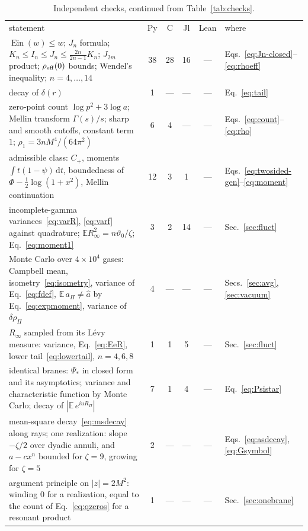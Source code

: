 \documentclass[aps,prd,10pt,twocolumn,superscriptaddress,nofootinbib,floatfix,longbibliography]{revtex4-2}
\newcommand{\bE}{\mathbb{E}}
\newcommand{\dd}{\mathrm{d}}
\newcommand{\Ein}{\operatorname{Ein}}
\begin{document}
\begin{table}[tp]
\caption{Independent checks, continued from Table~\ref{tab:checks}.}
\label{tab:checks2}
\begin{ruledtabular}
\setlength{\tabcolsep}{4pt}
\begin{tabular}{p{10.6cm}ccccl}
statement & Py & C & Jl & Lean & where\\
\colrule
$\Ein(w)\le w$; $J_n$ formula; $K_n\le I_n\le J_n\le\frac{2n}{2n-1}K_n$; $J_{2m}$ product; $\rho_{\rm eff}(0)$ bounds; Wendel's inequality; $n=4,\dots,14$ & 38 & 28 & 16 & --- & Eqs.~\eqref{eq:Jn-closed}--\eqref{eq:rhoeff}\\
decay of $\delta(r)$ & 1 & --- & --- & --- & Eq.~\eqref{eq:tail}\\
zero-point count $\log p^2+3\log a$; Mellin transform $\Gamma(s)/s$; sharp and smooth cutoffs, constant term $1$; $\rho_1=3nM^4/(64\pi^2)$ & 6 & 4 & --- & --- & Eqs.~\eqref{eq:count}--\eqref{eq:rho}\\
admissible class: $C_+$, moments $\int t(1-\psi)\,\dd t$, boundedness of $\Phi-\frac12\log(1+x^2)$, Mellin continuation & 12 & 3 & 1 & --- & Eqs.~\eqref{eq:twosided-gen}--\eqref{eq:moment}\\
incomplete-gamma variances~\eqref{eq:varR}, \eqref{eq:varf} against quadrature; $\bE R_\infty^2=n\vartheta_0/\zeta$; Eq.~\eqref{eq:moment1} & 3 & 2 & 14 & --- & Sec.~\ref{sec:fluct}\\
Monte Carlo over $4\times10^4$ gases: Campbell mean, isometry~\eqref{eq:isometry}, variance of Eq.~\eqref{eq:fdef}, $\bE\,a_\Pi\ne\hat a$ by Eq.~\eqref{eq:expmoment}, variance of $\delta\rho_\Pi$ & 4 & --- & --- & --- & Secs.~\ref{sec:avg}, \ref{sec:vacuum}\\
$R_\infty$ sampled from its L\'evy measure: variance, Eq.~\eqref{eq:EeR}, lower tail~\eqref{eq:lowertail}, $n=4,6,8$ & 1 & 1 & 5 & --- & Sec.~\ref{sec:fluct}\\
identical branes: $\Psi_*$ in closed form and its asymptotics; variance and characteristic function by Monte Carlo; decay of $|\bE\,e^{iuR_\Pi}|$ & 7 & 1 & 4 & --- & Eq.~\eqref{eq:Psistar}\\
mean-square decay~\eqref{eq:msdecay} along rays; one realization: slope $-\zeta/2$ over dyadic annuli, and $a-cx^n$ bounded for $\zeta=9$, growing for $\zeta=5$ & 2 & --- & --- & --- & Eqs.~\eqref{eq:asdecay}, \eqref{eq:Gsymbol}\\
argument principle on $|z|=2M^2$: winding $0$ for a realization, equal to the count of Eq.~\eqref{eq:qzeros} for a resonant product & 1 & --- & --- & --- & Sec.~\ref{sec:onebrane}\\

\end{tabular}
\end{ruledtabular}
\end{table}
\end{document}
